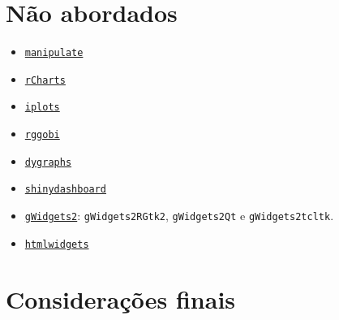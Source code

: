 \section{Não abordados}

\begin{frame}

  \begin{itemize}
  \item 
    \href{https://cran.r-project.org/web/packages/manipulate/index.html}{\texttt{manipulate}}
  \item 
    \href{http://ramnathv.github.io/rCharts/}{\texttt{rCharts}}
  \item
    \href{http://cran.r-project.org/web/packages/iplots/index.html}{\texttt{iplots}}
  \item
    \href{http://cran.r-project.org/web/packages/rggobi/index.html}{\texttt{rggobi}}
  \item
    \href{https://rstudio.github.io/dygraphs/index.html}{\texttt{dygraphs}}
  \item
    \href{http://rstudio.github.io/shinydashboard/index.html}{\texttt{shinydashboard}}
  \item
    \href{https://cran.r-project.org/web/packages/gWidgets2/index.html}{\texttt{gWidgets2}}:
    \texttt{gWidgets2RGtk2}, \texttt{gWidgets2Qt} e \texttt{gWidgets2tcltk}.
  \item
    \href{http://www.htmlwidgets.org/index.html}{\texttt{htmlwidgets}}
  \end{itemize}

\end{frame}

\section{Considerações finais}


